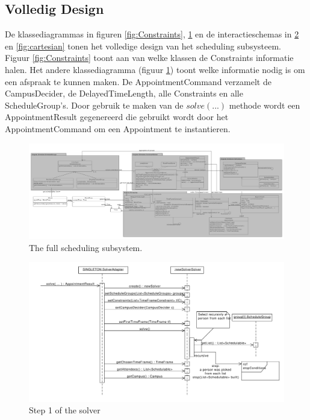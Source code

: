 \subsection{Volledig Design}
De klassediagrammas in figuren \ref{fig:Constraints}, \ref{fig:fullScheduling} en de interactieschemas in \ref{fig:solver} en \ref{fig:cartesian} tonen het volledige design van het scheduling subsysteem. 
Figuur \ref{fig:Constraints} toont aan van welke klassen de Constraints informatie halen. 
Het andere klassediagramma (figuur \ref{fig:fullScheduling}) toont welke informatie nodig is om een afspraak te kunnen maken. 
De AppointmentCommand verzamelt de CampusDecider, de DelayedTimeLength, alle Constraints en alle ScheduleGroup's. 
Door gebruik te maken van de $solve(...)$ methode wordt een AppointmentResult gegenereerd die gebruikt wordt door het AppointmentCommand om een Appointment te instantieren. 
\\

\begin{figure}
\vspace{-2cm}
\centering
 \includegraphics[width=1.05\textheight, angle=270]{./exported/ScheduleGroup_End.pdf}
 \caption{The full scheduling subsystem.}
 \label{fig:fullScheduling}
\vspace{2cm}
\end{figure}

\begin{figure}
\hspace{-2cm}
 \includegraphics[width=1.2\textwidth]{./exported/interaction/Solver.pdf}
 \caption{Step 1 of the solver}
 \label{fig:solver}
\hspace{2cm}
\end{figure}

